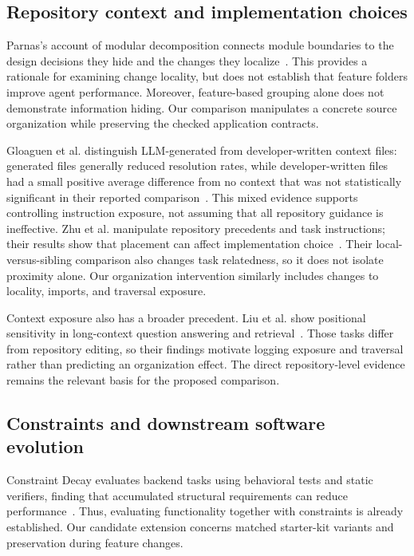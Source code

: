 \documentclass[11pt,a4paper]{article}
\begin{document}
\subsection{Repository context and implementation choices}
Parnas's account of modular decomposition connects module boundaries to the design decisions they hide and the changes they localize~\cite{parnas1972modules}. This provides a rationale for examining change locality, but does not establish that feature folders improve agent performance. Moreover, feature-based grouping alone does not demonstrate information hiding. Our comparison manipulates a concrete source organization while preserving the checked application contracts.

Gloaguen et al. distinguish LLM-generated from developer-written context files: generated files generally reduced resolution rates, while developer-written files had a small positive average difference from no context that was not statistically significant in their reported comparison~\cite{gloaguen2026agents}. This mixed evidence supports controlling instruction exposure, not assuming that all repository guidance is ineffective. Zhu et al. manipulate repository precedents and task instructions; their results show that placement can affect implementation choice~\cite{zhu2026precedent}. Their local-versus-sibling comparison also changes task relatedness, so it does not isolate proximity alone. Our organization intervention similarly includes changes to locality, imports, and traversal exposure.

Context exposure also has a broader precedent. Liu et al. show positional sensitivity in long-context question answering and retrieval~\cite{liu2024lost}. Those tasks differ from repository editing, so their findings motivate logging exposure and traversal rather than predicting an organization effect. The direct repository-level evidence remains the relevant basis for the proposed comparison.

\subsection{Constraints and downstream software evolution}
Constraint Decay evaluates backend tasks using behavioral tests and static verifiers, finding that accumulated structural requirements can reduce performance~\cite{dente2026constraint}. Thus, evaluating functionality together with constraints is already established. Our candidate extension concerns matched starter-kit variants and preservation during feature changes.
\end{document}
